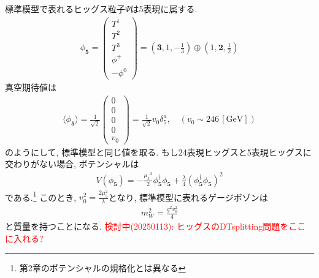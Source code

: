 標準模型で表れるヒッグス粒子$\Psi$は5表現に属する.
\begin{align}
  \phi_{\bm{5}} = \left(
  \begin{array}{c}
      T^1 \\
      T^2 \\
      T^3 \\
      \phi^+ \\
      -\phi^0
  \end{array}\right) =\left(\bm{3}, 1,-\frac{1}{3}\right)\oplus\left(1,\bm{2},\frac{1}{2}\right)\label{Higgs_5}
\end{align}
真空期待値は
\begin{align}
  \langle\phi_{\bm{5}}\rangle = \frac{1}{\sqrt{2}}\left(
  \begin{array}{c}
      0 \\
      0 \\
      0 \\
      0 \\
      v_0
  \end{array}\right) = \frac{1}{\sqrt{2}}v_0\delta_5^a,\quad(v_0\sim 246\,[\mathrm{GeV}]) \label{Higgs_VEV_5}
\end{align}
のようにして, 標準模型と同じ値を取る.
もし24表現ヒッグスと5表現ヒッグスに交わりがない場合, ポテンシャルは
\begin{align}
  V(\phi_{\bm{5}}) = -\frac{{\mu_5}^2}{2}\phi_{\bm{5}}^\dagger \phi_{\bm{5}} + \frac{\lambda}{4}(\phi_{\bm{5}}^\dagger \phi_{\bm{5}})^2
\end{align}
である.\footnote{第2章のポテンシャルの規格化とは異なる}
このとき, $v_0^2 =\frac{2\mu_5^2}{\lambda}$となり, 標準模型に表れるゲージボゾンは
\begin{align}
  m_W^2 = \frac{g^2 v_0^2}{4}
\end{align}
と質量を持つことになる.
\textcolor{red}{検討中(20250113): ヒッグスのDTsplitting問題をここに入れる?}

